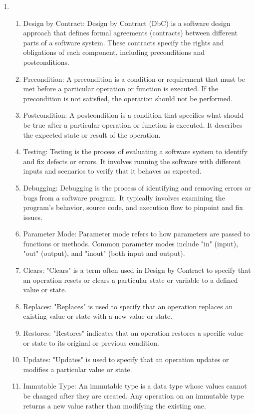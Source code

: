 \documentclass{article}
\begin{document}
\begin{enumerate}
\item 
\begin{enumerate}
    \item Design by Contract: Design by Contract (DbC) is a software design approach that defines formal agreements (contracts) between different parts of a software system. These contracts specify the rights and obligations of each component, including preconditions and postconditions.
    \item Precondition: A precondition is a condition or requirement that must be met before a particular operation or function is executed. If the precondition is not satisfied, the operation should not be performed.
    \item Postcondition: A postcondition is a condition that specifies what should be true after a particular operation or function is executed. It describes the expected state or result of the operation.
    \item Testing: Testing is the process of evaluating a software system to identify and fix defects or errors. It involves running the software with different inputs and scenarios to verify that it behaves as expected.
    \item Debugging: Debugging is the process of identifying and removing errors or bugs from a software program. It typically involves examining the program's behavior, source code, and execution flow to pinpoint and fix issues.
    \item Parameter Mode: Parameter mode refers to how parameters are passed to functions or methods. Common parameter modes include "in" (input), "out" (output), and "inout" (both input and output).
    \item Clears: "Clears" is a term often used in Design by Contract to specify that an operation resets or clears a particular state or variable to a defined value or state.
    \item Replaces: "Replaces" is used to specify that an operation replaces an existing value or state with a new value or state.
    \item Restores: "Restores" indicates that an operation restores a specific value or state to its original or previous condition.
    \item Updates: "Updates" is used to specify that an operation updates or modifies a particular value or state.
    \item Immutable Type: An immutable type is a data type whose values cannot be changed after they are created. Any operation on an immutable type returns a new value rather than modifying the existing one.

\end{enumerate}
\end{enumerate}
\end{document}

